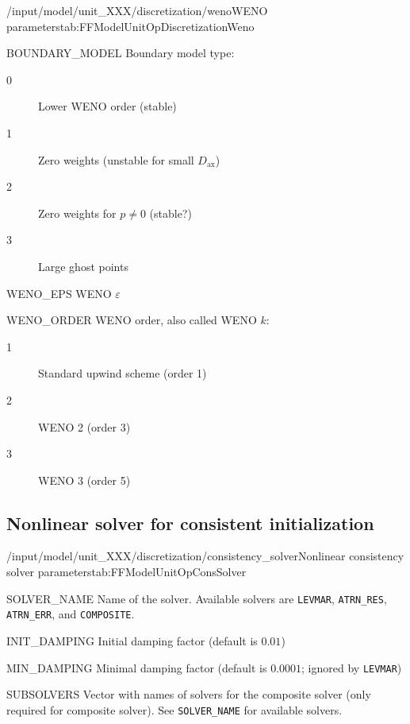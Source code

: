 \begin{subgroup}{/input/model/unit\_XXX/discretization/weno}{WENO parameters}{tab:FFModelUnitOpDiscretizationWeno}
  \begin{dataset}[type=int,range={$\{ 0,1,2,3 \}$},length=1]{BOUNDARY\_MODEL}
    Boundary model type:
    \begin{description}
      \item[0] Lower WENO order (stable)
      \item[1] Zero weights (unstable for small $D_{\mathrm{ax}}$)
      \item[2] Zero weights for $p \neq 0$ (stable?)
      \item[3] Large ghost points
    \end{description}\vspace{-\baselineskip}
  \end{dataset}
  \begin{dataset}[type=double,range={$\geq 0$},length=1]{WENO\_EPS}
    WENO $\varepsilon$
  \end{dataset}
  \begin{dataset}[type=int,range={$\{ 1,2,3 \}$},length=1]{WENO\_ORDER}
    WENO order, also called WENO $k$:
    \begin{description}
      \item[1] Standard upwind scheme (order 1)
      \item[2] WENO 2 (order 3)
      \item[3] WENO 3 (order 5)
    \end{description}\vspace{-\baselineskip}
  \end{dataset}
\end{subgroup}

\subsection{Nonlinear solver for consistent initialization}

\begin{subgroup}{/input/model/unit\_XXX/discretization/consistency\_solver}{Nonlinear consistency solver parameters}{tab:FFModelUnitOpConsSolver}
  \begin{dataset}[type=string,length=1]{SOLVER\_NAME}
    Name of the solver.
    Available solvers are \texttt{LEVMAR}, \texttt{ATRN\_RES}, \texttt{ATRN\_ERR}, and \texttt{COMPOSITE}.
  \end{dataset}
  \begin{dataset}[type=double,range={$\geq 0$},length=1]{INIT\_DAMPING}
    Initial damping factor (default is $0.01$)
  \end{dataset}
  \begin{dataset}[type=double,range={$\geq 0$},length=1]{MIN\_DAMPING}
    Minimal damping factor (default is $0.0001$; ignored by \texttt{LEVMAR})
  \end{dataset}
  \begin{dataset}[type=string,length={$> 1$}]{SUBSOLVERS}
    Vector with names of solvers for the composite solver (only required for composite solver).
    See \texttt{SOLVER\_NAME} for available solvers.
  \end{dataset}
\end{subgroup}

